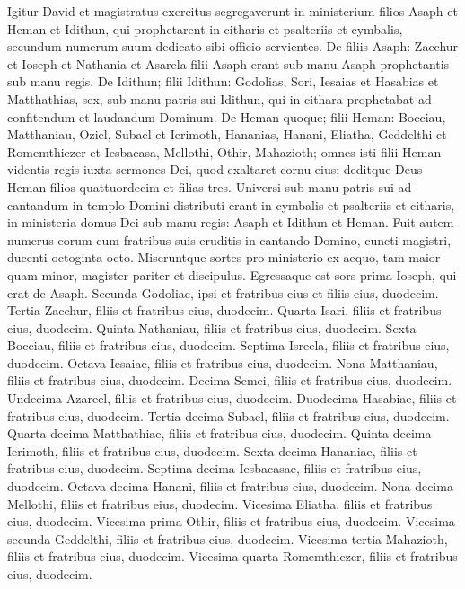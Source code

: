\begin{biblechapter}  
\verse Igitur David et magistratus exercitus segregaverunt in ministerium filios Asaph et Heman et Idithun, qui prophetarent in citharis et psalteriis et cymbalis, secundum numerum suum dedicato sibi officio servientes. 
\verse De filiis Asaph: Zacchur et Ioseph et Nathania et Asarela filii Asaph erant sub manu Asaph prophetantis sub manu regis. 
\verse De Idithun; filii Idithun: Godolias, Sori, Iesaias et Hasabias et Matthathias, sex, sub manu patris sui Idithun, qui in cithara prophetabat ad confitendum et laudandum Dominum. 
\verse De Heman quoque; filii Heman: Bocciau, Matthaniau, Oziel, Subael et Ierimoth, Hananias, Hanani, Eliatha, Geddelthi et Romemthiezer et Iesbacasa, Mellothi, Othir, Mahazioth; 
\verse omnes isti filii Heman videntis regis iuxta sermones Dei, quod exaltaret cornu eius; deditque Deus Heman filios quattuordecim et filias tres. 
\verse Universi sub manu patris sui ad cantandum in templo Domini distributi erant in cymbalis et psalteriis et citharis, in ministeria domus Dei sub manu regis: Asaph et Idithun et Heman. 
\verse Fuit autem numerus eorum cum fratribus suis eruditis in cantando Domino, cuncti magistri, ducenti octoginta octo. 
\verse Miseruntque sortes pro ministerio ex aequo, tam maior quam minor, magister pariter et discipulus. 
\verse Egressaque est sors prima Ioseph, qui erat de Asaph. Secunda Godoliae, ipsi et fratribus eius et filiis eius, duodecim. 
\verse Tertia Zacchur, filiis et fratribus eius, duodecim. 
\verse Quarta Isari, filiis et fratribus eius, duodecim. 
\verse Quinta Nathaniau, filiis et fratribus eius, duodecim. 
\verse Sexta Bocciau, filiis et fratribus eius, duodecim. 
\verse Septima Isreela, filiis et fratribus eius, duodecim. 
\verse Octava Iesaiae, filiis et fratribus eius, duodecim. 
\verse Nona Matthaniau, filiis et fratribus eius, duodecim. 
\verse Decima Semei, filiis et fratribus eius, duodecim. 
\verse Undecima Azareel, filiis et fratribus eius, duodecim. 
\verse Duodecima Hasabiae, filiis et fratribus eius, duodecim. 
\verse Tertia decima Subael, filiis et fratribus eius, duodecim. 
\verse Quarta decima Matthathiae, filiis et fratribus eius, duodecim. 
\verse Quinta decima Ierimoth, filiis et fratribus eius, duodecim. 
\verse Sexta decima Hananiae, filiis et fratribus eius, duodecim.  
\verse Septima decima Iesbacasae, filiis et fratribus eius, duodecim. 
\verse Octava decima Hanani, filiis et fratribus eius, duodecim. 
\verse Nona decima Mellothi, filiis et fratribus eius, duodecim. 
\verse Vicesima Eliatha, filiis et fratribus eius, duodecim. 
\verse Vicesima prima Othir, filiis et fratribus eius, duodecim.  
\verse Vicesima secunda Geddelthi, filiis et fratribus eius, duodecim. 
\verse Vicesima tertia Mahazioth, filiis et fratribus eius, duodecim. 
\verse Vicesima quarta Romemthiezer, filiis et fratribus eius, duodecim. 
\end{biblechapter}

